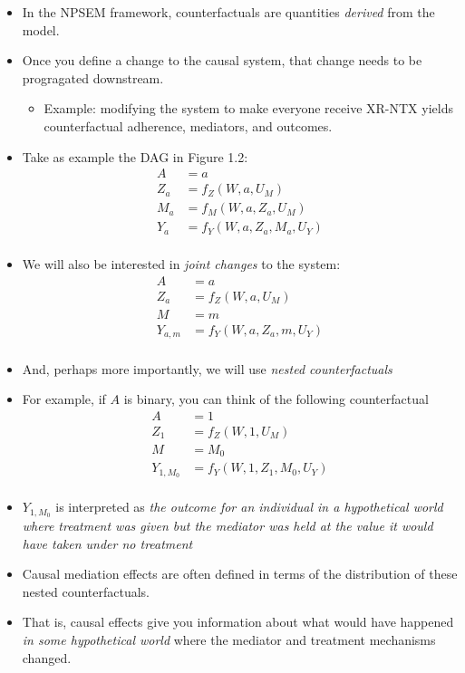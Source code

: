 \documentclass[
  12pt,
]{book}
\providecommand{\tightlist}{%
  \setlength{\itemsep}{0pt}\setlength{\parskip}{0pt}}
\theoremstyle{definition}
\theoremstyle{definition}
\theoremstyle{definition}
\newcommand{\1}{\mathbbm{1}}
\begin{document}
\begin{itemize}
\tightlist
\item
  In the NPSEM framework, counterfactuals are quantities \emph{derived} from the
  model.
\item
  Once you define a change to the causal system, that change needs to be
  progragated downstream.

  \begin{itemize}
  \tightlist
  \item
    Example: modifying the system to make everyone receive XR-NTX yields
    counterfactual adherence, mediators, and outcomes.
  \end{itemize}
\item
  Take as example the DAG in Figure 1.2:
  \begin{align}
    A    &= a\\
    Z_a  &= f_Z(W, a, U_M)\\
    M_a  &= f_M(W, a, Z_a, U_M)\\
    Y_a  &= f_Y(W, a, Z_a, M_a, U_Y)\\
  \end{align}
\item
  We will also be interested in \emph{joint changes} to the system:
  \begin{align}
    A        &= a \\
    Z_a      &= f_Z(W, a, U_M) \\
    M        &= m \\
    Y_{a,m}  &= f_Y(W, a, Z_a, m, U_Y) \\
  \end{align}
\item
  And, perhaps more importantly, we will use \emph{nested counterfactuals}
\item
  For example, if \(A\) is binary, you can think of the following counterfactual
  \begin{align}
    A          &= 1 \\
    Z_1        &= f_Z(W, 1, U_M) \\
    M          &= M_0 \\
    Y_{1, M_0} &= f_Y(W, 1, Z_1, M_0, U_Y) \\
  \end{align}
\item
  \(Y_{1, M_0}\) is interpreted as \emph{the outcome for an individual in a
  hypothetical world where treatment was given but the mediator was held at the
  value it would have taken under no treatment}
\item
  Causal mediation effects are often defined in terms of the distribution of
  these nested counterfactuals.
\item
  That is, causal effects give you information about what would have happened
  \emph{in some hypothetical world} where the mediator and treatment mechanisms
  changed.
\end{itemize}
\end{document}
